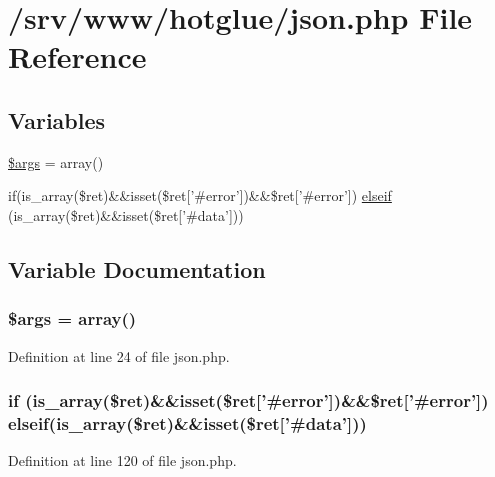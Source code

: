 \hypertarget{json_8php}{
\section{/srv/www/hotglue/json.php File Reference}
\label{json_8php}
}
\subsection*{Variables}
\begin{DoxyCompactItemize}
\item 
\hyperlink{json_8php_a67e94494731d99ed23b123e95175bc10}{\$args} = array()
\item 
if(is\_\-array(\$ret)\&\&isset(\$ret\mbox{[}'\#error'\mbox{]})\&\&\$ret\mbox{[}'\#error'\mbox{]}) \hyperlink{json_8php_affd32ec1771cd364116738727d3a1ed8}{elseif} (is\_\-array(\$ret)\&\&isset(\$ret\mbox{[}'\#data'\mbox{]}))
\end{DoxyCompactItemize}


\subsection{Variable Documentation}
\hypertarget{json_8php_a67e94494731d99ed23b123e95175bc10}{
\subsubsection[{\$args}]{\setlength{\rightskip}{0pt plus 5cm}\$args = array()}}
\label{json_8php_a67e94494731d99ed23b123e95175bc10}


Definition at line 24 of file json.php.

\hypertarget{json_8php_affd32ec1771cd364116738727d3a1ed8}{
\subsubsection[{elseif}]{\setlength{\rightskip}{0pt plus 5cm}if (is\_\-array(\$ret)\&\&isset(\$ret\mbox{[}'\#error'\mbox{]})\&\&\$ret\mbox{[}'\#error'\mbox{]}) {\bf elseif}(is\_\-array(\$ret)\&\&isset(\$ret\mbox{[}'\#data'\mbox{]}))}}
\label{json_8php_affd32ec1771cd364116738727d3a1ed8}


Definition at line 120 of file json.php.

